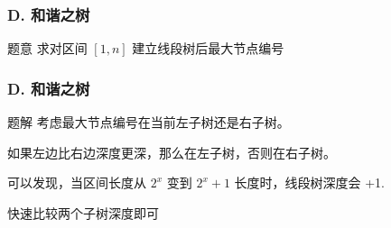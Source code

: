 \renewcommand{\problemname}{D. 和谐之树}

\begin{frame}\frametitle{\problemname}
	
	\begin{block}{题意}
		求对区间 $[1,n]$ 建立线段树后最大节点编号
	\end{block}
\end{frame}

\begin{frame}\frametitle{\problemname}
	
	\begin{block}{题解}
		考虑最大节点编号在当前左子树还是右子树。

		如果左边比右边深度更深，那么在左子树，否则在右子树。

		可以发现，当区间长度从 $2^x$ 变到 $2^x+1$ 长度时，线段树深度会 +1.

		快速比较两个子树深度即可
	\end{block}
\end{frame}